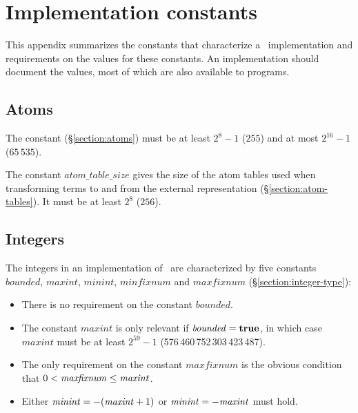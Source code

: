 %
%
%
%
%
%
%

\chapter{Implementation constants}

This appendix summarizes the constants that characterize a \StdErlang\ implementation
and requirements on the values for these constants.  An implementation should
document the values, most of which are also available to programs.

\section*{Atoms}

The constant
 (\S\ref{section:atoms}) must be at least $2^8-1$ ($255$)
and at most $2^{16}-1$ ($65\,535$).

The constant $\mathit{atom\_table\_size}$ gives
the size of the atom tables used when transforming terms to and from
the external representation (\S\ref{section:atom-tables}).
It must be at least $2^8$ ($256$).

\section*{Integers}

The integers in an implementation of \StdErlang\ are characterized by
five constants $\mathit{bounded}$, $\mathit{maxint}$, $\mathit{minint}$,
$\mathit{minfixnum}$ and $\mathit{maxfixnum}$
(\S\ref{section:integer-type}):
\begin{itemize}
\item There is no requirement on the constant $\mathit{bounded}$.
\item The constant $\mathit{maxint}$ is only relevant if $\it{bounded}={\bf true}$,
in which case $\mathit{maxint}$ must be at least $2^{59}-1$ (576\,460\,752\,303\,423\,487).
\item The only requirement on the constant $\mathit{maxfixnum}$ is the obvious
condition that $0 < {\it maxfixnum} \leq {\it maxint}$.
\item Either
${\it minint} = -({\it maxint}+1)$ or ${\it minint} = -{\it maxint}$ must hold.
\end{itemize}

